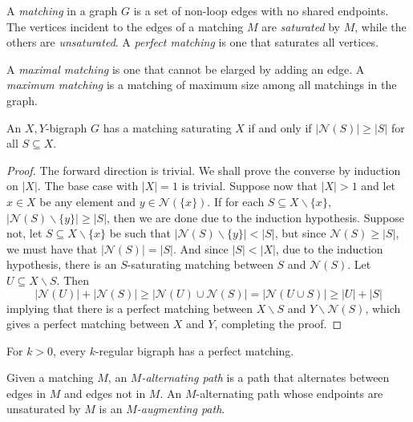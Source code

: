 \begin{definition}
    A \textit{matching} in a graph $G$ is a set of non-loop edges with no shared endpoints. The vertices incident to the edges of a matching $M$ are \textit{saturated} by $M$, while the others are \textit{unsaturated}. A \textit{perfect matching} is one that saturates all vertices. 

    A \textit{maximal matching} is one that cannot be elarged by adding an edge. A \textit{maximum matching} is a matching of maximum size among all matchings in the graph.
\end{definition}

\begin{theorem}[Hall, 1935]
    An $X,Y$-bigraph $G$ has a matching saturating $X$ if and only if $|\mathcal{N}(S)|\ge|S|$ for all $S\subseteq X$.
\end{theorem}
\begin{proof}
    The forward direction is trivial. We shall prove the converse by induction on $|X|$. The base case with $|X| = 1$ is trivial. Suppose now that $|X| > 1$ and let $x\in X$ be any element and $y\in\mathcal{N}(\{x\})$. If for each $S\subseteq X\backslash\{x\}$, $|\mathcal{N}(S)\backslash\{y\}|\ge|S|$, then we are done due to the induction hypothesis. Suppose not, let $S\subseteq X\backslash\{x\}$ be such that $|\mathcal{N}(S)\backslash\{y\}| < |S|$, but since $\mathcal{N}(S)\ge|S|$, we must have that $|\mathcal{N}(S)| = |S|$. And since $|S| < |X|$, due to the induction hypothesis, there is an $S$-saturating matching between $S$ and $\mathcal{N}(S)$. Let $U\subseteq X\backslash S$. Then 
    \begin{equation*}
        |\mathcal{N}(U)| + |\mathcal{N}(S)|\ge|\mathcal{N}(U)\cup\mathcal{N}(S)|=|\mathcal{N}(U\cup S)|\ge|U| + |S|
    \end{equation*}
    implying that there is a perfect matching between $X\backslash S$ and $Y\backslash\mathcal{N}(S)$, which gives a perfect matching between $X$ and $Y$, completing the proof.
\end{proof}
\begin{corollary}
    For $k > 0$, every $k$-regular bigraph has a perfect matching.
\end{corollary}


\begin{definition}
    Given a matching $M$, an \textit{$M$-alternating path} is a path that alternates between edges in $M$ and edges not in $M$. An $M$-alternating path whose endpoints are unsaturated by $M$ is an \textit{$M$-augmenting path}.
\end{definition}

